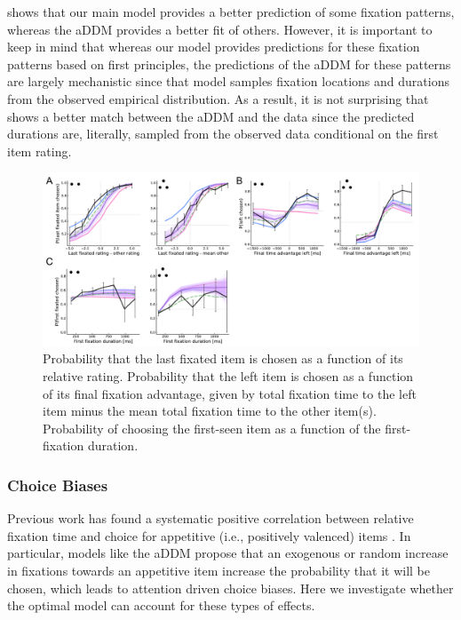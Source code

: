 shows that our main model provides a better prediction of some fixation patterns, whereas the aDDM provides a better fit of others. However, it is important to keep in mind that whereas our model provides predictions for these fixation patterns based on first principles, the predictions of the aDDM for these patterns are largely mechanistic since that model samples fixation locations and durations from the observed empirical distribution. As a result, it is not surprising that  shows a better match between the aDDM and the data since the predicted durations are, literally, sampled from the observed data conditional on the first item rating.


\begin{figure}[t!]
  \centering
  \includegraphics[width=\textwidth]{figs/attention/Fig7.pdf}
  \caption{
   Probability that the last fixated item is chosen as a function of its relative rating.
   Probability that the left item is chosen as a function of its final fixation advantage, given by total fixation time to the left item minus the mean total fixation time to the other item(s).
   Probability of choosing the first-seen item as a function of the first-fixation duration.
  }
  \label{fig:attention7}
\end{figure}

\subsubsection{Choice Biases}

Previous work has found a systematic positive correlation between relative fixation time and choice for appetitive (i.e., positively valenced) items \citep{shimojo2003gaze,armel2008neuroeconomic,armel2008biasing,krajbich2010visual,krajbich2011multialternative, gluth2020valuebased}. In particular, models like the aDDM propose that an exogenous or random increase in fixations towards an appetitive item increase the probability that it will be chosen, which leads to attention driven choice biases.  Here we investigate whether the optimal model can account for these types of effects.

